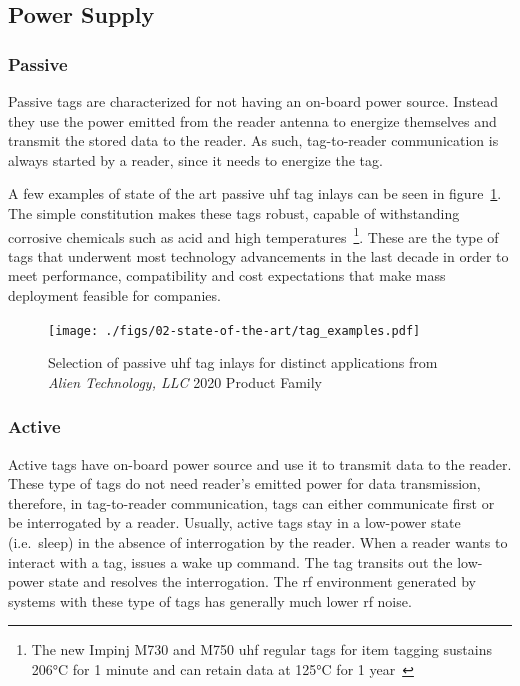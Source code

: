 \subsection{Power Supply}

\subsubsection{Passive}

Passive tags are characterized for not having an on-board power source. 
Instead they use the power emitted from the reader antenna to energize themselves and transmit the stored data to the reader.
As such, tag-to-reader communication is always started by a reader, since it needs to energize the tag.

A few examples of state of the art passive \ac{uhf} tag inlays can be seen in figure~\ref{fig:alienAlienProductFamily2020}.
The simple constitution makes these tags robust, capable of withstanding corrosive chemicals such as acid and high temperatures~\footnote{The new Impinj M730 and M750 \ac{uhf} regular tags for item tagging sustains \ang{206}C for 1 minute and can retain data at \ang{125}C for 1 year~\cite[Tab. 18]{ImpinjM730M750}}.
These are the type of tags that underwent most technology advancements in the last decade in order to meet performance, compatibility and cost expectations that make mass deployment feasible for companies.

\begin{figure}[!ht]
    \centering
    \texttt{[image: ./figs/02-state-of-the-art/tag\_examples.pdf]}
    \caption{Selection of passive \ac{uhf} tag inlays for distinct applications from \textit{Alien Technology, LLC} 2020 Product Family~\cite{alienAlienProductFamily2020}} 
    \label{fig:alienAlienProductFamily2020}
\end{figure}

\subsubsection{Active}

Active tags have on-board power source and use it to transmit data to the reader.
These type of tags do not need reader's emitted power for data transmission, therefore, in tag-to-reader communication, tags can either communicate first or be interrogated by a reader.
Usually, active tags stay in a low-power state (i.e.\ sleep) in the absence of interrogation by the reader. When a reader wants to interact with a tag, issues a wake up command. The tag transits out the low-power state and resolves the interrogation.
The \ac{rf} environment generated by systems with these type of tags has generally much lower \ac{rf} noise.

